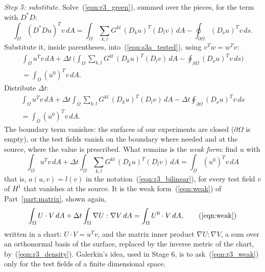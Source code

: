 \emph{Step 5: substitute.} Solve~(\ref{eqn:r3_green}), summed over the pieces, for the term with $D^*D$:
\begin{equation*}
\int_\Omega (D^*Du)^Tv\, dA = \int_\Omega \sum_{k,l} G^{kl}\,(D_ku)^T(D_lv)\, dA - \oint_{\partial\Omega} (D_\nu u)^Tv\, ds .
\end{equation*}
Substitute it, inside parentheses, into~(\ref{eqn:s3a_tested}), using $v^Tw = w^Tv$:
\begin{multline*}
\int_\Omega u^Tv\, dA + \Delta t\,\Big(\int_\Omega \sum_{k,l} G^{kl}\,(D_ku)^T(D_lv)\, dA - \oint_{\partial\Omega} (D_\nu u)^Tv\, ds\Big) \\
= \int_\Omega (u^0)^Tv\, dA .
\end{multline*}
Distribute $\Delta t$:
\begin{multline*}
\int_\Omega u^Tv\, dA + \Delta t\int_\Omega \sum_{k,l} G^{kl}\,(D_ku)^T(D_lv)\, dA - \Delta t\oint_{\partial\Omega} (D_\nu u)^Tv\, ds \\
= \int_\Omega (u^0)^Tv\, dA .
\end{multline*}
The boundary term vanishes: the surfaces of our experiments are closed ($\partial\Omega$ is empty), or the test fields vanish on the boundary where needed and at the source, where the value is prescribed. What remains is the \emph{weak form}: find $u$ with
\begin{equation}
\label{eqn:r3_weak}
\boxed{\; \int_\Omega u^Tv\, dA + \Delta t\int_\Omega \sum_{k,l} G^{kl}\,(D_ku)^T(D_lv)\, dA = \int_\Omega (u^0)^Tv\, dA \;}
\end{equation}
that is, $a(u, v) = l(v)$ in the notation~(\ref{eqn:r3_bilinear}), for every test field $v$ of $H^1$ that vanishes at the source. It is the weak form~(\ref{eqn:weak}) of Part~\ref{part:matrix}, shown again,
\begin{equation*}
\int_\Omega U \cdot V\, dA + \Delta t \int_\Omega \nabla U : \nabla V\, dA = \int_\Omega U^0 \cdot V\, dA , \tag{\ref{eqn:weak}}
\end{equation*}
written in a chart: $U\cdot V = u^Tv$, and the matrix inner product $\nabla U:\nabla V$, a sum over an orthonormal basis of the surface, replaced by the inverse metric of the chart, by~(\ref{eqn:r3_density}). Galerkin's idea, used in Stage 6, is to ask~(\ref{eqn:r3_weak}) only for the test fields of a finite dimensional space.

